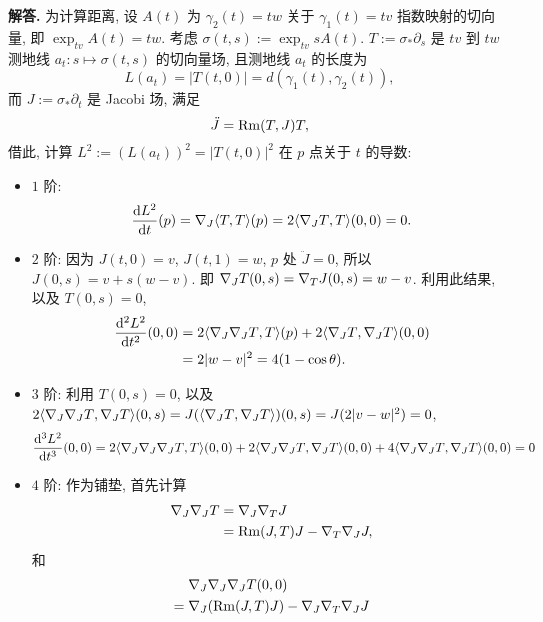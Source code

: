 \documentclass{ctexart}
\newenvironment{solution}{\par\noindent\textbf{解答. }}{\par}
\begin{document}
\begin{solution}
    为计算距离, 设 $A(t)$ 为 $\gamma_2(t) = tw$ 关于 $\gamma_1(t) = tv$ 指数映射的切向量, 即 $\exp_{tv}A(t) = tw$. 考虑 $\sigma(t, s) := \exp_{tv}sA(t)$. $T := \sigma_{\ast}\partial_s$ 是 $tv$ 到 $tw$ 测地线 $a_t \colon s \mapsto \sigma(t, s)$ 的切向量场, 且测地线 $a_t$ 的长度为 
    \[
        L(a_t) = |T(t, 0)| = d(\gamma_1(t), \gamma_2(t)),
    \]
    而 $J := \sigma_{\ast}\partial_t$ 是 Jacobi 场, 满足
    \[
        \ddot{J} = \mathrm{Rm}(T, J)T,
    \]
    借此, 计算 $L^2 := (L(a_t))^2 = |T(t, 0)|^2$ 在 $p$ 点关于 $t$ 的导数:
    \begin{itemize}
        \item $1$ 阶:
        \[
            \dfrac{\mathop{}\!\mathrm{d} L^2}{\mathop{}\!\mathrm{d} t}(p) = \nabla_{J}\langle {T}, {T} \rangle(p) = 2\langle {\nabla_{J}T}, {T} \rangle(0, 0) = 0.
        \]
        \item $2$ 阶: 因为 $J(t, 0) = v$, $J(t, 1) = w$, $p$ 处 $\ddot{J} = 0$, 所以 $J(0, s) = v + s(w - v)$. 即 $\nabla_{J}T(0, s) = \nabla_{T}J(0, s) = w - v$. 利用此结果, 以及 $T(0, s) = 0$,
        \[
            \begin{aligned}
                \dfrac{\mathop{}\!\mathrm{d} ^2 L^2}{\mathop{}\!\mathrm{d} t^2}(0, 0) ={} & 2\langle {\nabla_{J}\nabla_{J}T}, {T} \rangle(p) + 2\langle {\nabla_{J}T}, {\nabla_{J}T} \rangle(0, 0) \\
                ={} & 2|w - v|^2 = 4(1 - \cos \theta).
            \end{aligned}
        \]
        \item $3$ 阶: 利用 $T(0, s) = 0$, 以及 $2\langle {\nabla_{J}\nabla_{J}T}, {\nabla_{J}T} \rangle(0, s) = J(\langle {\nabla_{J}T}, {\nabla_{J}T} \rangle)(0, s) = J(2|v - w|^2) = 0$,
        \[
                \dfrac{\mathop{}\!\mathrm{d} ^3 L^2}{\mathop{}\!\mathrm{d} t^3}(0, 0) = 2\langle {\nabla_{J}\nabla_{J}\nabla_{J}T}, {T} \rangle(0, 0) + 2\langle {\nabla_{J}\nabla_{J}T}, {\nabla_{J}T} \rangle(0, 0) + 4\langle {\nabla_{J}\nabla_{J}T}, {\nabla_{J}T} \rangle(0, 0) = 0
        \]
        \item $4$ 阶: 作为铺垫, 首先计算
        \[
            \begin{aligned}
                \nabla_{J}\nabla_{J}T ={} & \nabla_{J}\nabla_{T}J \\
                ={} & \mathrm{Rm}(J, T)J - \nabla_{T}\nabla_{J}J,
            \end{aligned}
        \]
        和
        \[
            \begin{aligned}
                {} & \Div{J}\Div{J}\Div{J}T(0, 0) \\
                ={} & \Div{J}(\Rm(J, T)J) - \Div{J}\Div{T}\Div{J}J \\

\end{aligned}\]
\end{itemize}
\end{solution}
\end{document}
